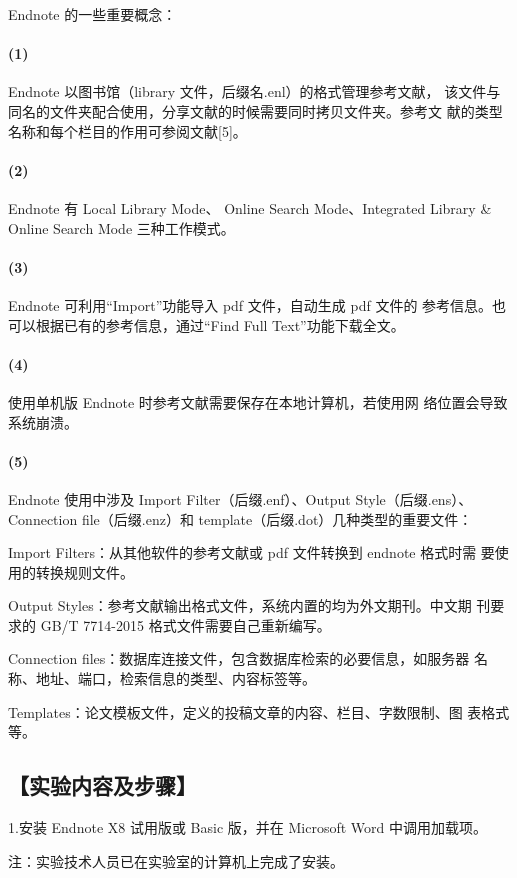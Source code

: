 \documentclass[12pt,a4paper,UTF8]{ctexart}
\begin{document}
Endnote 的一些重要概念：


\paragraph*{(1)} 
Endnote 以图书馆（library 文件，后缀名.enl）的格式管理参考文献，
该文件与同名的文件夹配合使用，分享文献的时候需要同时拷贝文件夹。参考文
献的类型名称和每个栏目的作用可参阅文献[5]。
\paragraph*{(2)} 
Endnote 有 Local Library Mode、 Online Search Mode、Integrated
Library \& Online Search Mode 三种工作模式。
\paragraph*{(3)} 
Endnote 可利用“Import”功能导入 pdf 文件，自动生成 pdf 文件的
参考信息。也可以根据已有的参考信息，通过“Find Full Text”功能下载全文。
\paragraph*{(4)} 
使用单机版 Endnote 时参考文献需要保存在本地计算机，若使用网
络位置会导致系统崩溃。
\paragraph*{(5)} 
Endnote 使用中涉及 Import Filter（后缀.enf）、Output Style（后缀.ens）、
Connection file（后缀.enz）和 template（后缀.dot）几种类型的重要文件：

Import Filters：从其他软件的参考文献或 pdf 文件转换到 endnote 格式时需
要使用的转换规则文件。

Output Styles：参考文献输出格式文件，系统内置的均为外文期刊。中文期
刊要求的 GB/T 7714-2015 格式文件需要自己重新编写。

Connection files：数据库连接文件，包含数据库检索的必要信息，如服务器
名称、地址、端口，检索信息的类型、内容标签等。

Templates：论文模板文件，定义的投稿文章的内容、栏目、字数限制、图
表格式等。


\subsection*{【实验内容及步骤】}
1.安装 Endnote X8 试用版或 Basic 版，并在 Microsoft Word 中调用加载项。

注：实验技术人员已在实验室的计算机上完成了安装。\\
\end{document}
